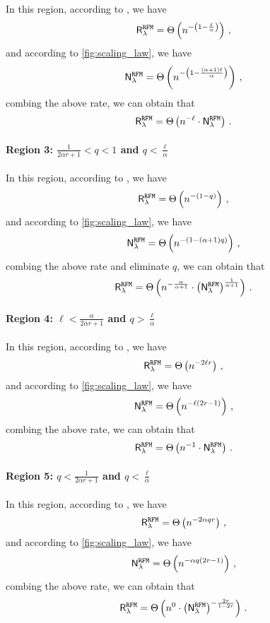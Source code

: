 In this region, according to \citet[Corollary 4.1]{defilippis2024dimension}, we have
\[
\mathsf R_\lambda^{\tt RFM} = \Theta\left( n^{-\left(1-\frac{\ell}{\alpha}\right)} \right)\,,
\]
and according to \cref{fig:scaling_law}, we have
\[
\mathsf N_\lambda^{\tt RFM} = \Theta\left( n^{-\left(1-\frac{(\alpha+1)\ell}{\alpha}\right)} \right)\,,
\]
combing the above rate, we can obtain that
\[
\mathsf R_\lambda^{\tt RFM} = \Theta\left( n^{-\ell} \cdot \mathsf N_\lambda^{\tt RFM} \right)\,.
\]

\paragraph{Region 3: $\frac{1}{2\alpha r+1} < q < 1$ and $q < \frac{\ell}{\alpha}$}

In this region, according to \citet[Corollary 4.1]{defilippis2024dimension}, we have
\[
\mathsf R_\lambda^{\tt RFM} = \Theta\left( n^{-\left(1-q\right)} \right)\,,
\]
and according to \cref{fig:scaling_law}, we have
\[
\mathsf N_\lambda^{\tt RFM} = \Theta\left( n^{-\left(1-(\alpha+1)q\right)} \right)\,,
\]
combing the above rate and eliminate $q$, we can obtain that
\[
\mathsf R_\lambda^{\tt RFM} = \Theta\left( n^{-\frac{\alpha}{\alpha+1}} \cdot \left(\mathsf N_\lambda^{\tt RFM}\right)^{\frac{1}{\alpha+1}} \right)\,.
\]

\paragraph{Region 4: $\ell < \frac{\alpha}{2\alpha r+1}$ and $q > \frac{\ell}{\alpha}$}

In this region, according to \citet[Corollary 4.1]{defilippis2024dimension}, we have
\[
\mathsf R_\lambda^{\tt RFM} = \Theta\left( n^{-2\ell r} \right)\,,
\]
and according to \cref{fig:scaling_law}, we have
\[
\mathsf N_\lambda^{\tt RFM} = \Theta\left( n^{-\ell(2r-1)} \right)\,,
\]
combing the above rate, we can obtain that
\[
\mathsf R_\lambda^{\tt RFM} = \Theta\left( n^{-1} \cdot \mathsf N_\lambda^{\tt RFM} \right)\,.
\]

\paragraph{Region 5: $q < \frac{1}{2\alpha r+1}$ and $q < \frac{\ell}{\alpha}$}

In this region, according to \citet[Corollary 4.1]{defilippis2024dimension}, we have
\[
\mathsf R_\lambda^{\tt RFM} = \Theta\left( n^{-2\alpha q r} \right)\,,
\]
and according to \cref{fig:scaling_law}, we have
\[
\mathsf N_\lambda^{\tt RFM} = \Theta\left( n^{-\alpha q(2r-1)} \right)\,,
\]
combing the above rate, we can obtain that
\[
\mathsf R_\lambda^{\tt RFM} = \Theta\left( n^0 \cdot \left(\mathsf N_\lambda^{\tt RFM}\right)^{-\frac{2r}{1-2r}} \right)\,.
\]



